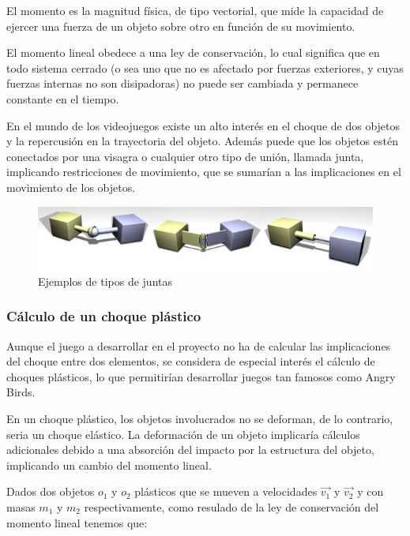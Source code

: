 El momento es la magnitud física, de tipo vectorial, que mide la capacidad de ejercer una fuerza de un objeto sobre otro en función de su movimiento.
\newline

El momento lineal obedece a una ley de conservación, lo cual significa que en todo sistema cerrado (o sea uno que no es afectado por fuerzas exteriores, y cuyas fuerzas internas no son disipadoras) no puede ser cambiada y permanece constante en el tiempo.
\newline

En el mundo de los videojuegos existe un alto interés en el choque de dos objetos y la repercusión en la trayectoria del objeto. Además puede que los objetos estén conectados por una visagra o cualquier otro tipo de unión, llamada junta, implicando restricciones de movimiento, que se sumarían a las implicaciones en el movimiento de los objetos.
\newline

\begin{figure}[h]
	\centering	
	\includegraphics[width=12cm]{img/Joints.jpg}
	\caption{Ejemplos de tipos de juntas}
\end{figure}

\subsubsection{Cálculo de un choque plástico}
Aunque el juego a desarrollar en el proyecto no ha de calcular las implicaciones del choque entre dos elementos, se considera de especial interés el cálculo de choques plásticos, lo que permitirían desarrollar juegos tan famosos como Angry Birds.
\newline

En un choque plástico, los objetos involucrados no se deforman, de lo contrario, seria un choque elástico. La deformación de un objeto implicaría cálculos adicionales debido a una absorción del impacto por la estructura del objeto, implicando un cambio del momento lineal.
\newline

Dados dos objetos $o_1$ y $o_2$ plásticos que se mueven a velocidades $\vec{v_1}$ y $\vec{v_2}$ y con masas $m_1$ y $m_2$ respectivamente, como resulado de la ley de conservación del momento lineal tenemos que:

